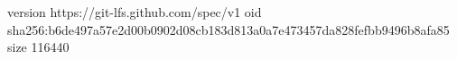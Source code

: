 version https://git-lfs.github.com/spec/v1
oid sha256:b6de497a57e2d00b0902d08cb183d813a0a7e473457da828fefbb9496b8afa85
size 116440

